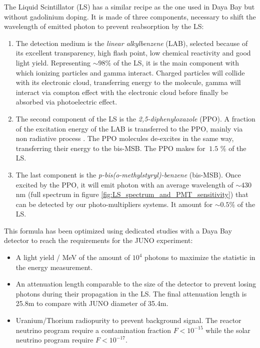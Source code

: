 The Liquid Scintillator (LS) has a similar recipe as the one used in Daya Bay \cite{bay_optimization_2020} but without gadolinium doping. It is made of three components, necessary to shift the wavelength of emitted photon to prevent reabsorption by the LS:
\begin{enumerate}
  \item The detection medium is the \textit{linear alkylbenzene} (LAB), selected because of its excellent transparency, high flash point, low chemical reactivity and good light yield. Representing $\sim 98\%$ of the LS, it is the main component with which ionizing particles and gamma interact. Charged particles will collide with its electronic cloud, transferring energy to the molecule, gamma will interact via compton effect with the electronic cloud before finally be absorbed via photoelectric effect.
  \item The second component of the LS is the \textit{2,5-diphenyloxazole} (PPO). A fraction of the excitation energy of the LAB is transferred to the PPO, mainly via non radiative process \cite{birks_chapter_1964}. The PPO molecules de-excites in the same way, transferring their energy to the bis-MSB. The PPO makes for $~1.5$ \% of the LS.
  \item The last component is the \textit{p-bis(o-methylstyryl)-benzene} (bis-MSB). Once excited by the PPO, it will emit photon with an average wavelength of $\sim430$ nm (full spectrum in figure \ref{fig:LS_spectrum_and_PMT_sensitivity}) that can be detected by our photo-multipliers systems. It amount for $\sim 0.5$\% of the LS.
\end{enumerate}
This formula has been optimized using dedicated studies with a Daya Bay detector \cite{bay_optimization_2020, zhang_complete_2020} to reach the requirements for the JUNO experiment:

\begin{itemize}
  \item A light yield / MeV of the amount of $10^4$ photons to maximize the statistic in the energy measurement.
  \item An attenuation length comparable to the size of the detector to prevent losing photons during their propagation in the LS. The final attenuation length is 25.8m \cite{yang_light_2017} to compare with JUNO diameter of 35.4m.
  \item Uranium/Thorium radiopurity to prevent background signal. The reactor neutrino program require a contamination fraction $F<10^{-15}$ while the solar neutrino program require $F<10^{-17}$.
\end{itemize}

